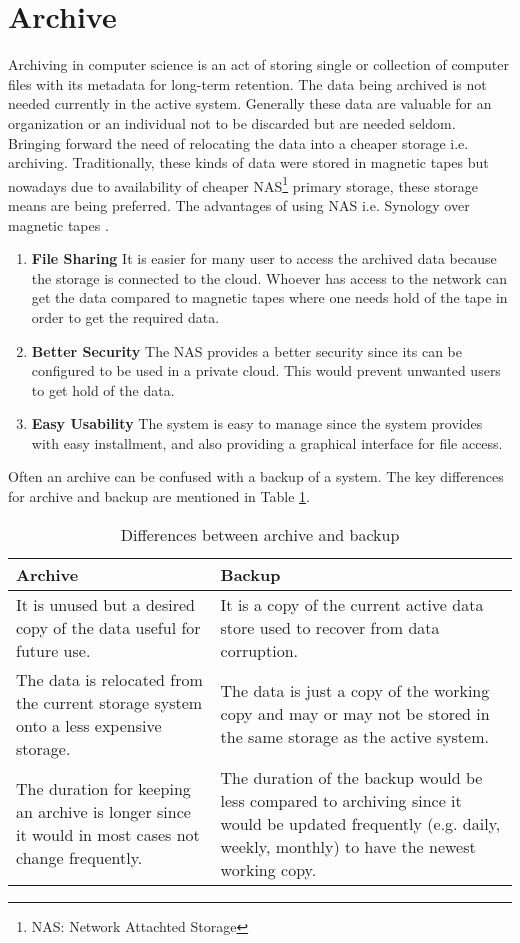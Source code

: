 \newpage
\section{Archive}

Archiving in computer science is an act of storing single or collection of computer files with its metadata for long-term retention. The data being archived is 
not needed currently in the active system. Generally these data are valuable for an organization or an individual not to be discarded but are needed seldom. 
Bringing forward the need of relocating the data into a cheaper storage i.e. archiving. Traditionally, these kinds of data were stored in magnetic tapes but nowadays 
due to availability of cheaper NAS\footnote{NAS: Network Attachted Storage} primary storage, 
these storage means are being preferred. 
The advantages of using NAS i.e. Synology over magnetic tapes \cite{Synology}.
\begin{enumerate}
    \item \textbf{File Sharing} It is easier for many user to access the archived data because the storage is connected to the cloud. Whoever has access to the
    network can get the data compared to magnetic tapes where one needs hold of the tape in order to get the required data.
    \item \textbf{Better Security} The NAS provides a better security since its can be configured to be used in a private cloud. This would prevent unwanted users
    to get hold of the data.
    \item \textbf{Easy Usability} The system is easy to manage since the system provides with easy installment, and also providing a graphical interface for file access.
\end{enumerate}
Often an archive can be confused
with a backup of a system. The key differences for archive and backup are mentioned in Table \ref{table:archiveVsBackup}.

\begin{table}[h!]
    \centering
    \begin{tabular}{|p{8cm}|p{8cm}|}
        \hline
            \textbf{Archive}  & \textbf{Backup}\\
        \hline
            It is unused but a desired copy of the data useful for future use.& 
            It is a copy of the current active data store used to recover from data corruption. \\
        \hline
            The data is relocated from the current storage system onto a less expensive storage.
            & The data is just a copy of the working copy and may or may not be stored in the same storage as the active system.\\
        \hline
             The duration for keeping an archive is longer since it would in most cases not change frequently.
             & The duration of the backup would be less compared to archiving since it would be updated frequently (e.g. daily, weekly, monthly) to have the newest 
             working copy.\\
        \hline
    \end{tabular}
    \caption{Differences between archive and backup}
    \label{table:archiveVsBackup}     
\end{table}    